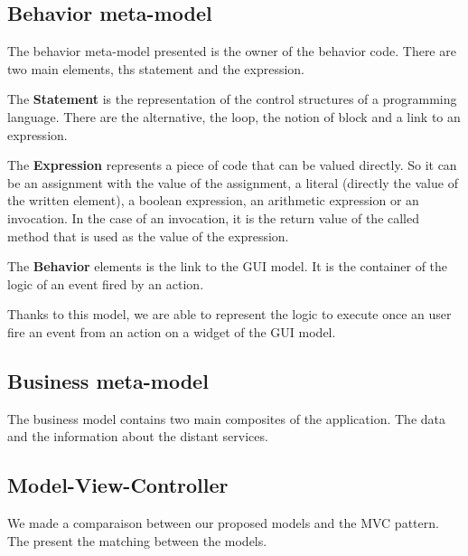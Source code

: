 \documentclass[conference]{IEEEtran}
\begin{document}
\subsection{Behavior meta-model}
\label{sec:behaviorModel}
    


The behavior meta-model presented  is the owner of
    the behavior code.
There are two main elements, ths statement and the expression.

The \textbf{Statement} is the representation of the control structures of
    a programming language.
There are the alternative, the loop, the notion of block and a link to an expression.

The \textbf{Expression} represents a piece of code that can be valued directly.
So it can be an assignment with the value of the assignment,
    a literal (\ie directly the value of the written element),
    a boolean expression, 
    an arithmetic expression
    or an invocation.
In the case of an invocation, it is the return value of the called method that
    is used as the value of the expression.

The \textbf{Behavior} elements is the link to the GUI model.
It is the container of the logic of an event fired by an action.

Thanks to this model, we are able to represent the logic to execute once an user
    fire an event from an action on a widget of the GUI model.

\subsection{Business meta-model}
\label{sec:businessModel}  

The business model contains two main composites of the application.
The data and the information about the distant services.

\subsection{Model-View-Controller}
\label{sec:mvc}

We made a comparaison between our proposed models and the MVC pattern.
The  present the matching between the models.
\end{document}
